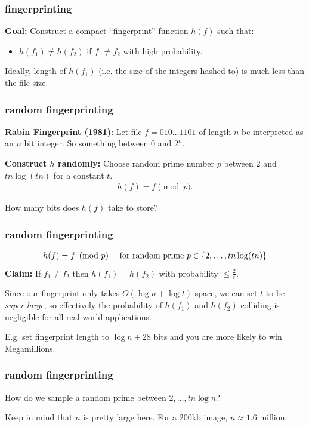 \documentclass[handout,compress]{beamer}
\begin{document}
\begin{frame}
	\frametitle{fingerprinting}
	\textbf{Goal:} Construct a compact ``fingerprint'' function $h(f)$ such that:
	\begin{itemize}
		\item $h(f_1) \neq h(f_2)$ if $f_1 \neq f_2$ with high probability.
	\end{itemize}
\vspace{1em}
	Ideally, length of $h(f_1)$ (i.e. the size of the integers hashed to) is much less than the file size. 
\end{frame}

\begin{frame}
	\frametitle{random fingerprinting}
	\textbf{Rabin Fingerprint (1981)}: Let file $f = 010\ldots1101$ of length $n$ be interpreted as an $n$ bit integer. So something between $0$ and $2^n$. 
	
	\textbf{Construct $h$ randomly:} Choose random prime number $p$  between $2$ and $tn\log(tn)$ for a constant $t$.
	\begin{align*}
		h(f) = f \pmod{p}.
	\end{align*} 
	
	\begin{center}
		How many bits does $h(f)$ take to store?
	\end{center}
	
\end{frame}

\begin{frame}[t]
	\frametitle{random fingerprinting}
	\begin{align*}
		h(f) = f \pmod{p} \text{\hspace{1em} for random prime } p\in \{2, \ldots, tn\log(tn)\}
	\end{align*} 
	\textbf{Claim:} If $f_1\neq f_2$ then $h(f_1) = h(f_2)$ with probability  $\leq \frac{2}{t}$.
	\vspace{3em}
	
	Since our fingerprint only takes $O(\log n + \log t)$ space,   we can  set $t$ to be \emph{super large}, so effectively the probability of $h(f_1)$ and $h(f_2)$ colliding is negligible for all real-world applications.
	
	E.g. set fingerprint length to $\log n + 28$ bits and you are more likely to win Megamillions.
\end{frame}

\begin{frame}[t]
	\frametitle{random fingerprinting}
	How do we sample a random prime between $2,\ldots, tn\log n$?


	Keep in mind that $n$ is pretty large here. For a 200kb image, $n \approx 1.6$ million. 
\end{frame}
\end{document}
